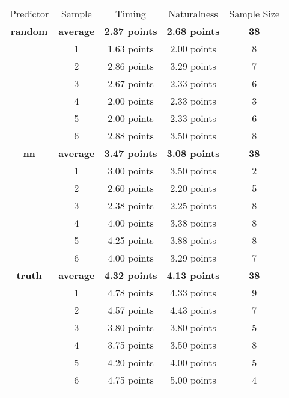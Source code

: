 \begin{tabular}{ccccc}
\hline\noalign{\smallskip}
Predictor & Sample & Timing & Naturalness & Sample Size \\
\noalign{\smallskip}\svhline\noalign{\smallskip}
\bf{random} & \bf{average} & \bf{2.37 points} & \bf{2.68 points} & \bf{38}\\
& 1 & 1.63 points & 2.00 points & 8\\
& 2 & 2.86 points & 3.29 points & 7\\
& 3 & 2.67 points & 2.33 points & 6\\
& 4 & 2.00 points & 2.33 points & 3\\
& 5 & 2.00 points & 2.33 points & 6\\
& 6 & 2.88 points & 3.50 points & 8\\
\noalign{\smallskip}\hline\noalign{\smallskip}
\bf{nn} & \bf{average} & \bf{3.47 points} & \bf{3.08 points} & \bf{38}\\
& 1 & 3.00 points & 3.50 points & 2\\
& 2 & 2.60 points & 2.20 points & 5\\
& 3 & 2.38 points & 2.25 points & 8\\
& 4 & 4.00 points & 3.38 points & 8\\
& 5 & 4.25 points & 3.88 points & 8\\
& 6 & 4.00 points & 3.29 points & 7\\
\noalign{\smallskip}\hline\noalign{\smallskip}
\bf{truth} & \bf{average} & \bf{4.32 points} & \bf{4.13 points} & \bf{38}\\
& 1 & 4.78 points & 4.33 points & 9\\
& 2 & 4.57 points & 4.43 points & 7\\
& 3 & 3.80 points & 3.80 points & 5\\
& 4 & 3.75 points & 3.50 points & 8\\
& 5 & 4.20 points & 4.00 points & 5\\
& 6 & 4.75 points & 5.00 points & 4 \\
\noalign{\smallskip}\hline\noalign{\smallskip}
\end{tabular}
